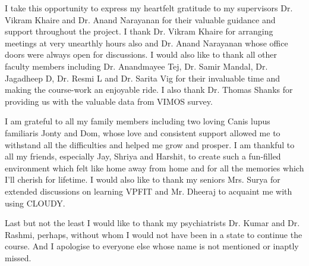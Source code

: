 \begin{ThesisAcknowledgments}

I take this opportunity to express my heartfelt gratitude to my supervisors Dr. Vikram Khaire and Dr. Anand Narayanan for their valuable guidance and support throughout the project. I thank Dr. Vikram Khaire for arranging meetings at very unearthly hours also and Dr. Anand Narayanan whose office doors were always open for discussions. I would also like to thank all other faculty members including Dr. Anandmayee Tej, Dr. Samir Mandal, Dr. Jagadheep D, Dr. Resmi L and Dr. Sarita Vig for their invaluable time and making the course-work an enjoyable ride. I also thank Dr. Thomas Shanks for providing us with the valuable data from VIMOS survey.

I am grateful to all my family members including two loving Canis lupus familiaris Jonty and Dom, whose love and consistent support allowed me to withstand all the difficulties and helped me grow and prosper. I am thankful to all my friends, especially Jay, Shriya and Harshit, to create such a fun-filled environment which felt like home away from home and for all the memories which I'll cherish for lifetime. I would also like to thank my seniors Mrs. Surya for extended discussions on learning VPFIT and Mr. Dheeraj to acquaint me with using CLOUDY. 

Last but not the least I would like to thank my psychiatrists Dr. Kumar and Dr. Rashmi, perhaps, without whom I would not have been in a state to continue the course. And I apologise to everyone else whose name is not mentioned or inaptly missed.

\vspace{25mm}

\hfill \Author

\end{ThesisAcknowledgments}
